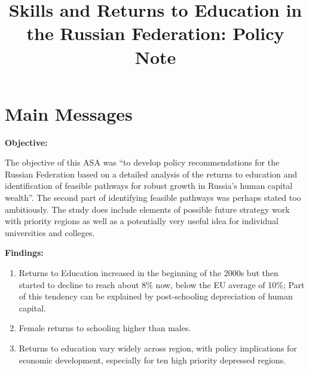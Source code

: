 \documentclass[alpha-refs]{wiley-article-04t}
\title{Skills and Returns to Education in the Russian Federation: Policy Note}
\author[]{}
\begin{document}
\maketitle
\vspace{-2.5cm}


\section{Main Messages}

\vspace{-0.5em}

\begin{mdframed}[hidealllines=true,backgroundcolor=blue!20]

	
\hspace{-1em}  \textbf{Objective:} 

\begin{small}
\phantom{0}
\end{small}

\vspace{-1em}

\hspace{-2.2em} The objective of this ASA was ``to develop policy 
recommendations for the 
Russian Federation based on a detailed analysis of the returns to education 
and identification of feasible pathways for robust growth in Russia's human 
capital wealth''. The second part of identifying feasible pathways was 
perhaps stated too ambitiously. The study does include elements of possible 
future strategy work with priority regions as well as a potentially very 
useful idea for individual universities and colleges. 
\vspace{0.5em}

\hspace{-2.8em}  \textbf{Findings:} 

\vspace{-1em}
\begin{enumerate}
\item Returns to Education increased in the beginning of the 2000s but then 
started to decline to reach about 8\% now, below the EU average of 10\%; 
Part of this tendency can be explained by post-schooling depreciation of 
human capital.

\item Female returns to schooling higher than males.

\item Returns to education vary widely across region, with policy	
implications for economic development, especially for ten high priority 
depressed regions.


\end{enumerate}
\end{mdframed}
\end{document}
